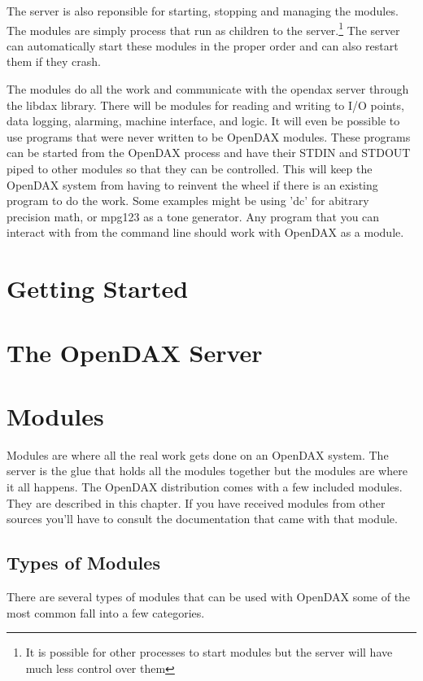 The server is also reponsible for starting, stopping and managing the modules.  The modules are simply process that run as children to the server.\footnote{It is possible for other processes to start modules but the server will have much less control over them}  The server can automatically start these modules in the proper order and can also restart them if they crash.

The modules do all the work and communicate with the opendax server through the libdax library. There will be modules for reading and writing to I/O points, data logging, alarming, machine interface, and logic. It will even be possible to use programs that were never written to be OpenDAX modules. These programs can be started from the OpenDAX process and have their STDIN and STDOUT piped to other modules so that they can be controlled. This will keep the OpenDAX system from having to reinvent the wheel if there is an existing program to do the work. Some examples might be using 'dc' for abitrary precision math, or mpg123 as a tone generator. Any program that you can interact with from the command line should work with OpenDAX as a module. 

\chapter{Getting Started}


\chapter{The OpenDAX Server}


\chapter{Modules}
Modules are where all the real work gets done on an OpenDAX system.  The server is the glue that holds all the modules together but the modules are where it all happens.  The OpenDAX distribution comes with a few included modules.  They are described in this chapter.  If you have received modules from other sources you'll have to consult the documentation that came with that module.

\section{Types of Modules}
There are several types of modules that can be used with OpenDAX some of the most common fall into a few categories.

